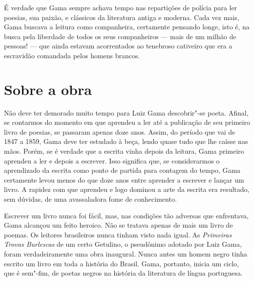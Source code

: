 É verdade que Gama sempre achava tempo nas repartições de polícia para
ler poesias, sua paixão, e clássicos da literatura antiga e moderna.
Cada vez mais, Gama buscava a leitura como companheira, certamente
pensando longe, isto é, na busca pela liberdade de todos os seus
companheiros --- mais de um milhão de pessoas! --- que ainda estavam
acorrentados ao tenebroso cativeiro que era a escravidão comandada pelos
homens brancos.

\section{Sobre a obra}

Não deve ter demorado muito tempo para Luiz Gama descobrir"-se poeta.
Afinal, se contarmos do momento em que aprendeu a ler até a publicação
de seu primeiro livro de poesias, se passaram apenas doze anos. Assim, do
período que vai de 1847 a 1859, Gama deve ter estudado à beça, lendo
quase tudo que lhe caísse nas mãos. Porém, se é verdade que a escrita
vinha depois da leitura, Gama primeiro aprendeu a ler e depois a
escrever. Isso significa que, se considerarmos o aprendizado da escrita
como ponto de partida para contagem do tempo, Gama certamente levou
menos do que doze anos entre aprender a escrever e lançar um livro. A
rapidez com que aprendeu e logo dominou a arte da escrita era resultado,
sem dúvidas, de uma avassaladora fome de conhecimento.

Escrever um livro nunca foi fácil, mas, nas condições tão adversas que
enfrentava, Gama alcançou um feito heroico. Não se tratava apenas de
mais um livro de poemas. Os leitores brasileiros nunca tinham visto nada
igual. As \emph{Primeiras Trovas Burlescas} de um certo Getulino, o
pseudônimo adotado por Luiz Gama, foram verdadeiramente uma obra
inaugural. Nunca antes um homem negro tinha escrito um livro em toda a
história do Brasil. Gama, portanto, inicia um ciclo, que é sem"-fim, de
poetas negros na história da literatura de língua portuguesa.

